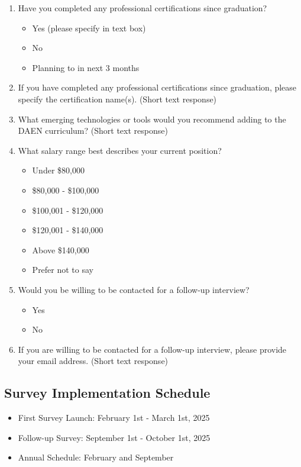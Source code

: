 \documentclass[12pt,a4paper]{article}
\begin{document}
\begin{enumerate}
\item Have you completed any professional certifications since graduation?
\begin{itemize}
    \item Yes (please specify in text box)
    \item No
    \item Planning to in next 3 months
\end{itemize}

\item If you have completed any professional certifications since graduation, please specify the certification name(s). (Short text response)

\item What emerging technologies or tools would you recommend adding to the DAEN curriculum? (Short text response)

\item What salary range best describes your current position?
\begin{itemize}
    \item Under \$80,000
    \item \$80,000 - \$100,000
    \item \$100,001 - \$120,000
    \item \$120,001 - \$140,000
    \item Above \$140,000
    \item Prefer not to say
\end{itemize}

\item Would you be willing to be contacted for a follow-up interview?
\begin{itemize}
    \item Yes
    \item No
\end{itemize}

\item If you are willing to be contacted for a follow-up interview, please provide your email address. (Short text response)
\end{enumerate}

\subsection{Survey Implementation Schedule}
\begin{itemize}
    \item First Survey Launch: February 1st - March 1st, 2025
    \item Follow-up Survey: September 1st - October 1st, 2025
    \item Annual Schedule: February and September
\end{itemize}
\end{document}

